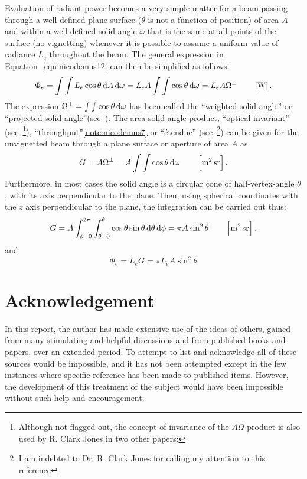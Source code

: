 Evaluation of radiant power becomes a very simple matter for a beam passing
through
a well-defined plane surface ($\theta$ is not a function of position) of area
$A$
and within a well-defined solid angle $\omega$ that is the same at all points of
the
surface (no vignetting) whenever it is possible to assume a uniform value of
radiance
$L_e$ throughout the beam. The general expression in Equation~\ref{eqn:nicodemus12} can
then be simplified as follows:
\begin{equation}
\Phi_e = \int \int L_e \cos\theta \mathop{}\!\mathrm{d} A \mathop{}\!\mathrm{d} \omega = L_e A \int \int \cos\theta
\mathop{}\!\mathrm{d} \omega =
L_e A \Omega^\perp
\qquad \left[\si{\watt}\right].
\end{equation}
The expression $\Omega^\perp = \int \int \cos\theta \mathop{}\!\mathrm{d} \omega$ has been called the
``weighted solid angle'' or ``projected solid angle''(see~).
The area-solid-angle-product, ``optical invariant''
(see~\footnote{Although not flagged out, the concept of
invariance of the $A\Omega$ product is also used by R. Clark Jones in two other
papers: }), ``throughput''\cref{note:nicodemus7} or
``\'etendue'' (see~\footnote{I am indebted to Dr. R. Clark
Jones for calling my attention to this reference}) can be given for the
unvignetted beam through a plane surface or aperture of area $A$ as
\begin{equation}
G = A\Omega^\perp = A \int \int \cos\theta \d \omega
\qquad \left[\si{\square\meter\steradian}\right].
\end{equation}
Furthermore, in most cases the solid angle is a circular cone of
half-vertex-angle
$\theta$, with its axis perpendicular to the plane. Then, using spherical
coordinates
with the $z$ axis perpendicular to the plane, the integration can be carried out thus:
\begin{equation}
G = A\int_{\phi = 0}^{2\pi} \int_{\theta=0}^{\theta}\cos\theta \sin\theta\d\theta \d\phi
=\pi A \sin^2\theta
\qquad \left[\si{\square\meter\steradian}\right].
\end{equation}
and
\begin{equation}
\Phi_e = L_e G = \pi L_e A \sin^2\theta
\end{equation}

\section{Acknowledgement}

In this report, the author has made extensive use of the ideas of others, gained
from many stimulating and helpful discussions and from published books and
papers, over an extended period. To attempt to list and acknowledge all of these
sources would be impossible, and it has not been attempted except in the few
instances where specific reference has been made to published items. However,
the development of this treatment of the subject would have been impossible
without such help and encouragement.

\let\originalbibsection\bibsection
\renewcommand{\bibsection}{\section{\refname}}
\let\bibsection\originalbibsection
